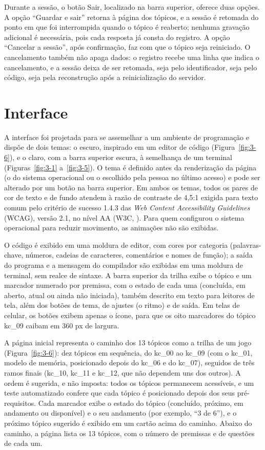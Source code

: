 Durante a sessão, o botão Sair, localizado na barra superior, oferece duas opções. A opção ``Guardar e sair'' retorna à página dos tópicos, e a sessão é retomada do ponto em que foi interrompida quando o tópico é reaberto; nenhuma gravação adicional é necessária, pois cada resposta já consta do registro. A opção ``Cancelar a sessão'', após confirmação, faz com que o tópico seja reiniciado. O cancelamento também não apaga dados: o registro recebe uma linha que indica o cancelamento, e a sessão deixa de ser retomada, seja pelo identificador, seja pelo código, seja pela reconstrução após a reinicialização do servidor.

\section{Interface}

A interface foi projetada para se assemelhar a um ambiente de programação e dispõe de dois temas: o escuro, inspirado em um editor de código (Figura~\ref{fig:3-6}), e o claro, com a barra superior escura, à semelhança de um terminal (Figuras~\ref{fig:3-1} a~\ref{fig:3-5}). O tema é definido antes da renderização da página (o do sistema operacional ou o escolhido pela pessoa no último acesso) e pode ser alterado por um botão na barra superior. Em ambos os temas, todos os pares de cor de texto e de fundo atendem à razão de contraste de 4,5:1 exigida para texto comum pelo critério de sucesso 1.4.3 das \textit{Web Content Accessibility Guidelines} (WCAG), versão 2.1, no nível AA (W3C, \citeyear{w3c2025}). Para quem configurou o sistema operacional para reduzir movimento, as animações não são exibidas.

O código é exibido em uma moldura de editor, com cores por categoria (palavras-chave, números, cadeias de caracteres, comentários e nomes de função); a saída do programa e a mensagem do compilador são exibidas em uma moldura de terminal, sem realce de sintaxe. A barra superior da trilha exibe o tópico e um marcador numerado por premissa, com o estado de cada uma (concluída, em aberto, atual ou ainda não iniciada), também descrito em texto para leitores de tela, além dos botões de tema, de ajustes (o ritmo) e de saída. Em telas de celular, os botões exibem apenas o ícone, para que os oito marcadores do tópico kc\_09 caibam em 360 px de largura.

A página inicial representa o caminho dos 13 tópicos como a trilha de um jogo (Figura~\ref{fig:3-6}): dez tópicos em sequência, do kc\_00 ao kc\_09 (com o kc\_01, modelo de memória, posicionado depois do kc\_06 e do kc\_07), seguidos de três ramos finais (kc\_10, kc\_11 e kc\_12, que não dependem uns dos outros). A ordem é sugerida, e não imposta: todos os tópicos permanecem acessíveis, e um teste automatizado confere que cada tópico é posicionado depois dos seus pré-requisitos. Cada marcador exibe o estado do tópico (concluído, próximo, em andamento ou disponível) e o seu andamento (por exemplo, ``3 de 6''), e o próximo tópico sugerido é exibido em um cartão acima do caminho. Abaixo do caminho, a página lista os 13 tópicos, com o número de premissas e de questões de cada um.

